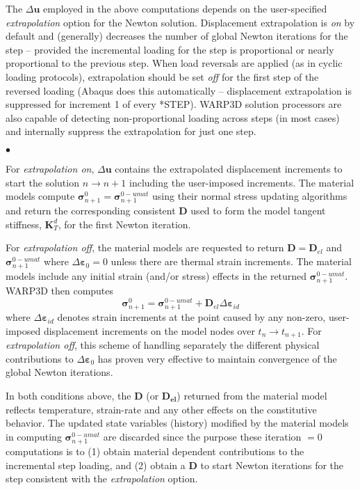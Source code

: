 \documentclass[11pt]{report}
\numberwithin{equation}{section}
\newcommand{\ti}{\emph}
\newcommand{\vepsilon}{\varepsilon}
\newcommand{\squishlist}{
 \begin{list}{$\bullet$}
  { \setlength{\itemsep}{0pt}
     \setlength{\parsep}{3pt}
     \setlength{\topsep}{3pt}
     \setlength{\partopsep}{0pt}
     \setlength{\leftmargin}{1.5em}
     \setlength{\labelwidth}{1em}
     \setlength{\labelsep}{0.5em} } }
\newcommand{\squishend}{
  \end{list}  }
\begin{document}
The $\Delta \bm{u}$ employed in the above computations depends on the user-specified \ti{extrapolation} 
option for the Newton solution. Displacement extrapolation is \ti{on} by default and (generally) decreases the number of
global Newton iterations for the step -- provided the incremental loading for the step is proportional
or nearly proportional to the previous step. When load reversals are applied (as in cyclic loading protocols),
extrapolation should be set \ti{off}  for the first step of the reversed loading (Abaqus does this automatically -- 
displacement extrapolation is suppressed for increment 1 of every *STEP). WARP3D solution processors
are also capable of detecting non-proportional loading across steps (in most cases) and internally suppress the
extrapolation for just one step.
\squishlist
\item For \ti{extrapolation on}, $\Delta \bm{u}$ contains the extrapolated displacement increments to
start the solution $n\rightarrow n+1$ including the user-imposed increments. The material models
compute $\bm{\sigma}^0_{n+1} = \bm{\sigma}^{0-umat}_{n+1}$ using their normal stress updating algorithms and return the 
corresponding consistent $\mathbf{D}$ used to form the model tangent stiffness,
$\mathbf{K}_T^d$, for the first Newton iteration.
\item For \ti{extrapolation off}, the material models are requested to return 
$\mathbf{D}=\mathbf{D}_{el}$ and $\bm{\sigma}^{0-umat}_{n+1}$ where 
$\Delta \bm{\vepsilon}_0=0$ unless there are thermal strain increments. The material models 
include any initial strain (and/or stress) effects in the returned $\bm{\sigma}^{0-umat}_{n+1}$.
WARP3D then computes
%
\begin{equation}\label{E:S4aa}
 \bm{\sigma}^0_{n+1} = \bm{\sigma}^{0-umat}_{n+1} + 
 \mathbf{D}_{el}\Delta  \bm{\varepsilon}_{id}
\end{equation}
where $\Delta  \bm{\varepsilon}_{id}$ denotes strain increments at the point caused by any non-zero, user-imposed displacement
increments on the model nodes over $t_n\rightarrow t_{n+1}$. 
For \ti{extrapolation off}, this scheme of handling separately the different physical contributions
to $\Delta  \bm{\varepsilon}_0$ has proven very effective to maintain convergence of the global Newton iterations.
\squishend

\noindent In both conditions above, the $\mathbf{D}$ (or  $\mathbf{D_{el}}$) returned from the material model reflects
temperature, strain-rate and any other effects on the constitutive behavior. The updated state variables (history)
modified by the material models in computing $\bm{\sigma}^{0-umat}_{n+1}$ are discarded since the
purpose these iteration $=0$ computations is to (1) obtain material dependent
contributions to the incremental step loading, and 
(2) obtain a   $\mathbf{D}$ to start Newton iterations for the step consistent with the \ti{extrapolation} option.
\end{document}

